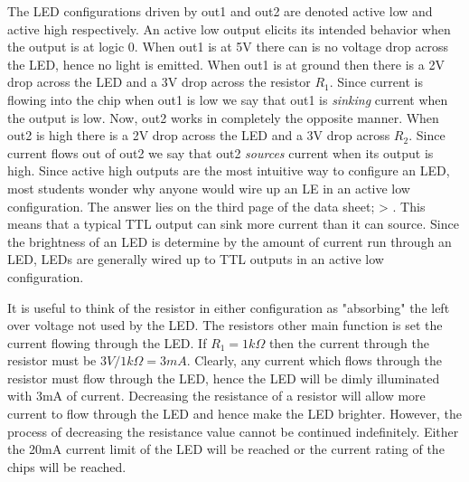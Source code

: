 The LED configurations driven by out1 and out2 are denoted active 
low and active high respectively.  An active low 
output elicits its intended behavior when the output is at logic 0.
When out1 is at 5V there can is no voltage drop across the LED, 
hence no light is emitted.  When out1 is at ground then there is 
a 2V drop across the LED and a 3V drop across the resistor $R_1$.  
Since current is 
flowing into the chip when out1 is low we say that out1 is 
\textit{ sinking} current when the output is low.  Now, out2 works in
completely the opposite manner.  When out2 is high there is a 
2V drop across the LED and a 3V drop across $R_2$.  Since current 
flows out of out2 we say that out2 \textit{ sources} current when its 
output is high.  Since active high outputs are the most intuitive
way to configure an LED, most students wonder why anyone would 
wire up an LE in an active low configuration.  The answer lies on
the third page of the data sheet; \IOL > \IOH.  This means
that a typical TTL output can sink more current than it can source.
Since the brightness of an LED is determine by the amount of current
run through an LED, LEDs are generally wired up to TTL outputs
in an active low configuration.

It is useful to think of the resistor in either configuration as 
"absorbing" the left over voltage not used by the LED.  The resistors 
other main function is set the current 
flowing through the LED.  If $R_1 = 1k \Omega$ then the current 
through the resistor must be $3V/1k \Omega = 3mA$.  Clearly, any
current which flows through the resistor must flow through the
LED, hence the LED will be dimly illuminated with 3mA of current.  
Decreasing the resistance of a  
resistor will allow more current to flow through the LED and hence
make the LED brighter.  However, the process of decreasing the
resistance value cannot be continued indefinitely.  Either the 20mA
current limit of the LED will be reached or the current rating of
the chips will be reached.  


